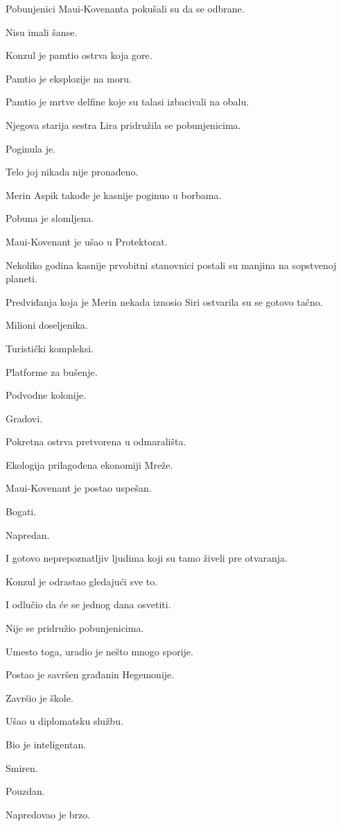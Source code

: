 Pobunjenici Maui-Kovenanta pokušali su da se odbrane.

Nisu imali šanse.

Konzul je pamtio ostrva koja gore.

Pamtio je eksplozije na moru.

Pamtio je mrtve delfine koje su talasi izbacivali na obalu.

Njegova starija sestra Lira pridružila se pobunjenicima.

Poginula je.

Telo joj nikada nije pronađeno.

Merin Aspik takođe je kasnije poginuo u borbama.

Pobuna je slomljena.

Maui-Kovenant je ušao u Protektorat.

Nekoliko godina kasnije prvobitni stanovnici postali su manjina na sopstvenoj planeti.

Predviđanja koja je Merin nekada iznosio Siri ostvarila su se gotovo tačno.

Milioni doseljenika.

Turistički kompleksi.

Platforme za bušenje.

Podvodne kolonije.

Gradovi.

Pokretna ostrva pretvorena u odmarališta.

Ekologija prilagođena ekonomiji Mreže.

Maui-Kovenant je postao uspešan.

Bogati.

Napredan.

I gotovo neprepoznatljiv ljudima koji su tamo živeli pre otvaranja.

Konzul je odrastao gledajući sve to.

I odlučio da će se jednog dana osvetiti.

\bigskip

Nije se pridružio pobunjenicima.

Umesto toga, uradio je nešto mnogo sporije.

Postao je savršen građanin Hegemonije.

Završio je škole.

Ušao u diplomatsku službu.

Bio je inteligentan.

Smiren.

Pouzdan.

Napredovao je brzo.

